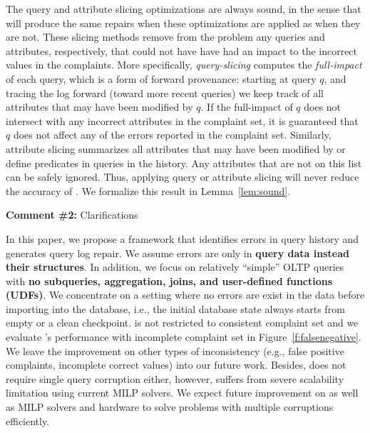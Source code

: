 The query and attribute slicing optimizations are always sound, in the sense
that \sys will produce the same repairs when these optimizations are applied
as when they are not. These slicing methods remove from the problem any
queries and attributes, respectively, that could not have have had an impact
to the incorrect values in the complaints. More specifically,
\emph{query-slicing} computes the \emph{full-impact} of each query, which is a
form of forward provenance: starting at query $q$, and tracing the log forward
(toward more recent queries) we keep track of all attributes that may have
been modified by $q$. If the full-impact of $q$ does not intersect with any
incorrect attributes in the complaint set, it is guaranteed that $q$ does not
affect any of the errors reported in the complaint set. Similarly, attribute
slicing summarizes all attributes that may have been modified by or define
predicates in queries in the history. Any attributes that are not on this list
can be safely ignored. Thus, applying query or attribute slicing will never
reduce the accuracy of \sys. We formalize this result in
Lemma~\ref{lem:sound}.


 
\comskip

\noindent
\textbf{Comment \#2:} Clarifications
\begin{quote}
\end{quote}

In this paper, we propose a framework \sys that identifies errors in query history and generates query log repair. 
We assume errors are only in \textbf{query data instead their structures}. In addition, we focus on relatively 
``simple'' OLTP queries with \textbf{no subqueries, aggregation, joins, and user-defined functions (UDFs)}. 
We concentrate on a setting where no errors are exist in the data before importing into the database, i.e., 
the initial database state always starts from empty or a clean checkpoint. \sys is not restricted to consistent 
complaint set and we evaluate \sys's performance with incomplete complaint set in Figure~\ref{f:falsenegative}. 
We leave the improvement on other types of inconsistency (e.g., false positive complaints, incomplete correct
values) into our future work. Besides, \sys does not require single query corruption either, however, \sys 
suffers from severe scalability limitation using current MILP solvers. We expect future improvement on \sys
as well as MILP solvers and hardware to solve problems with multiple corruptions efficiently. 

